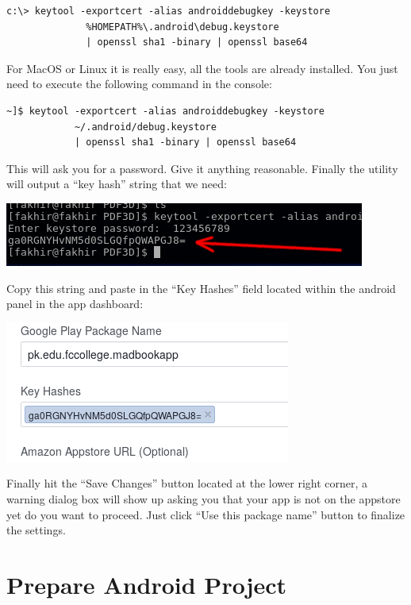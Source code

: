 \begin{verbatim}
c:\> keytool -exportcert -alias androiddebugkey -keystore
              %HOMEPATH%\.android\debug.keystore 
              | openssl sha1 -binary | openssl base64
\end{verbatim}

For MacOS or Linux it is really easy, all the tools are already installed. You just need to execute the following command in the console:
\begin{verbatim}
~]$ keytool -exportcert -alias androiddebugkey -keystore 
            ~/.android/debug.keystore 
            | openssl sha1 -binary | openssl base64
\end{verbatim}

This will ask you for a password. Give it anything reasonable. Finally the utility will output a ``key hash'' string that we need:

\begin{center}
	\includegraphics[scale=\SourceCodeScale]{chapters/ch12/images/7}
\end{center}

Copy this string and paste in the ``Key Hashes'' field located within the android panel in the app dashboard:

\begin{center}
	\includegraphics[scale=\SourceCodeScale]{chapters/ch12/images/8}
\end{center}

Finally hit the ``Save Changes'' button located at the lower right corner, a warning dialog box will show up asking you that your app is not on the appstore yet do you want to proceed. Just click ``Use this package name'' button to finalize the settings.

\section{Prepare Android Project}

